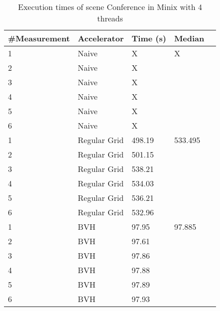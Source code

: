 \begin{table}[H]
	\small
	\begin{tabular}{|l|l|l|l|l|}
		\hline
		\#Measurement & Accelerator & Time (s) & Median \\ \hline
		1 & Naive & X & X \\ \hline
		2 & Naive & X & \\ \hline
		3 & Naive & X & \\ \hline
		4 & Naive & X & \\ \hline
		5 & Naive & X & \\ \hline
		6 & Naive & X & \\ \hline
		1 & Regular Grid & 498.19 & 533.495 \\ \hline
		2 & Regular Grid & 501.15 & \\ \hline
		3 & Regular Grid & 538.21 & \\ \hline
		4 & Regular Grid & 534.03 & \\ \hline
		5 & Regular Grid & 536.21 & \\ \hline
		6 & Regular Grid & 532.96 & \\ \hline
		1 & BVH & 97.95 & 97.885 \\ \hline
		2 & BVH & 97.61 & \\ \hline
		3 & BVH & 97.86 & \\ \hline
		4 & BVH & 97.88 & \\ \hline
		5 & BVH & 97.89 & \\ \hline
		6 & BVH & 97.93 & \\ \hline
	\end{tabular}
	\label{Time}
	\caption{Execution times of scene Conference in Minix with 4 threads}
\end{table}

